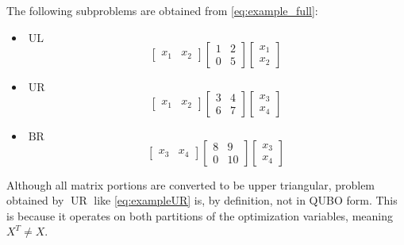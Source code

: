 The following subproblems are obtained from \eqref{eq:example_full}:
\begin{itemize}
    \item $\operatorname{UL}$
    \begin{equation}
        \begin{bmatrix}
            x_1 & x_2
        \end{bmatrix}
        \begin{bmatrix}
            1 & 2 \\
            0 & 5
        \end{bmatrix}
        \begin{bmatrix}
            x_1 \\
            x_2
        \end{bmatrix}
        \label{eq:exampleUL}
    \end{equation}
    \item $\operatorname{UR}$
    \begin{equation}
        \begin{bmatrix}
            x_1 & x_2
        \end{bmatrix}
        \begin{bmatrix}
            3 & 4 \\
            6 & 7
        \end{bmatrix}
        \begin{bmatrix}
            x_3 \\
            x_4
        \end{bmatrix}
        \label{eq:exampleUR}
    \end{equation}
    \item $\operatorname{BR}$
    \begin{equation}
        \begin{bmatrix}
            x_3 & x_4
        \end{bmatrix}
        \begin{bmatrix}
            8 & 9 \\
            0 & 10
        \end{bmatrix}
        \begin{bmatrix}
            x_3 \\
            x_4
        \end{bmatrix}
        \label{eq:exampleBR}
    \end{equation}
\end{itemize}

Although all matrix portions are converted to be upper triangular, problem obtained by $\operatorname{UR}$ like \eqref{eq:exampleUR} is, by definition, not in QUBO form. 
This is because it operates on both partitions of the optimization variables, meaning $X^T \neq X$.

